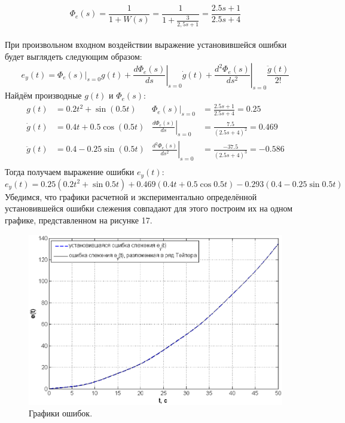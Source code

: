 \documentclass[12pt,a4paper]{article}
\begin{document}
\begin{equation}
   \Phi_e(s) = \frac{1}{1 + W(s)} = \frac{1}{1 + \displaystyle{\frac{3}{2,5s + 1}}} = \frac{2.5s+1}{2.5s+4}
\end{equation}\\
При произвольном входном воздействии выражение установившейся ошибки будет выглядеть следующим образом:
\begin{equation}
    e_y(t) = \Phi_e(s)|_{s=0}g(t) + \left.\frac{d\Phi_e(s)}{ds}\right|_{s=0}\dot{g}(t) + \left.\frac{d^2\Phi_e(s)}{ds^2}\right|_{s=0}\frac{\ddot{g}(t)}{2!}
\end{equation}
Найдём производные $g(t)$ и $\Phi_e(s)$:
\begin{align*}
    g(t) & = 0.2t^2 + \sin{(0.5t)} & \Phi_e(s)|_{s=0} & = \frac{2.5s+1}{2.5s+4} = 0.25 \\
    \dot{g}(t) & = 0.4t + 0.5\cos{(0.5t)} & \left.\frac{d\Phi_e(s)}{ds}\right|_{s=0} & = \frac{7.5}{(2.5s+4)^2} = 0.469 \\
    \ddot{g}(t) & = 0.4 - 0.25\sin{(0.5t)} & \left.\frac{d^2\Phi_e(s)}{ds^2}\right|_{s=0} & = \frac{-37.5}{(2.5s+4)^3} = -0.586 \\
\end{align*}
Тогда получаем выражение ошибки $e_y(t)$:
\begin{equation}
e_y(t) = 0.25(0.2t^2 + \sin{0.5t}) + 0.469(0.4t + 0.5\cos{0.5t}) - 0.293(0.4 - 0.25\sin{0.5t})
\end{equation}
Убедимся, что графики расчетной и экспериментально определённой установившейся ошибки слежения совпадают для этого построим их на одном графике, представленном на рисунке 17.
\begin{figure}[H]
    \centering
    \includegraphics[width=1\linewidth]{4.2.eps}
    \caption{Графики ошибок.}
\end{figure}
\end{document}
